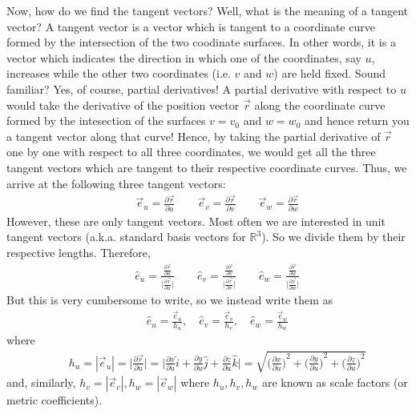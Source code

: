 \documentclass[12pt]{article}
\begin{document}
Now, how do we find the tangent vectors? Well, what is the meaning of a tangent vector? A tangent vector is a vector which is tangent to a coordinate curve formed by the intersection of the two coodinate surfaces. In other words, it is a vector which indicates the direction in which one of the coordinates, say $u$, increases while the other two coordinates (i.e. $v$ and $w$) are held fixed. Sound familiar? Yes, of course, partial derivatives! A partial derivative with respect to $u$ would take the derivative of the position vector $\vec{r}$ along the coordinate curve formed by the intesection of the surfaces $v=v_0$ and $w=w_0$ and hence return you a tangent vector along that curve! Hence, by taking the partial derivative of $\vec{r}$ one by one with respect to all three coordinates, we would get all the three tangent vectors which are tangent to their respective coordinate curves. Thus, we arrive at the following three tangent vectors:
\begin{eqnarray*}
&& \vec{e}_u = \frac{\partial \vec{r}}{\partial u} \qquad \vec{e}_v = \frac{\partial\vec{r}}{\partial v} \qquad \vec{e}_w = \frac{\partial\vec{r}}{\partial w}
\end{eqnarray*}
However, these are only tangent vectors. Most often we are interested in unit tangent vectors (a.k.a. standard basis vectors for $\mathbb{R}^3$). So we divide them by their respective lengths. Therefore,
\begin{eqnarray}
&& \hat{e}_u = \frac{\frac{\partial \vec{r}}{\partial u}}{\Big|\frac{\partial \vec{r}}{\partial u}\Big|}  \qquad \hat{e}_v = \frac{\frac{\partial\vec{r}}{\partial v}}{\Big|\frac{\partial\vec{r}}{\partial v}\Big|} \qquad \hat{e}_w = \frac{\frac{\partial\vec{r}}{\partial w}}{\Big|\frac{\partial\vec{r}}{\partial w}\Big|}
\end{eqnarray}
But this is very cumbersome to write, so we instead write them as
\begin{eqnarray*}
&& \hat{e}_u = \frac{\vec{e}_u}{h_u}, \quad \hat{e}_v = \frac{\vec{e}_v}{h_v}, \quad \hat{e}_w = \frac{\vec{e}_w}{h_w}
\end{eqnarray*}
where 
\begin{eqnarray*}
&& h_u = |\vec{e}_u| = \Big|\frac{\partial\vec{r}}{\partial u}\Big| = \Big|\frac{\partial x}{\partial u}\hat{i} + \frac{\partial y}{\partial u}\hat{j} + \frac{\partial z}{\partial u}\hat{k} \Big| = \sqrt{ {\Big(\frac{\partial x}{\partial u}\Big)}^2 + {\Big(\frac{\partial y}{\partial u}\Big)}^2 + {\Big(\frac{\partial z}{\partial u}\Big)}^2 }
\end{eqnarray*}
and, similarly, $h_v = |\vec{e}_v|, h_w = |\vec{e}_w|$ where $h_u,h_v,h_w$ are known as scale factors (or metric coefficients).
\end{document}
